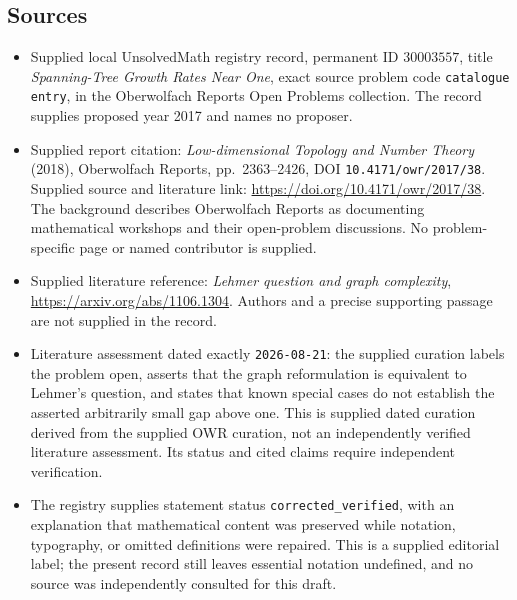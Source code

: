\documentclass[11pt]{article}
\begin{document}
\subsection{Sources}
\begin{itemize}
\item Supplied local UnsolvedMath registry record, permanent ID \(30003557\), title \emph{Spanning-Tree Growth Rates Near One}, exact source problem code \texttt{catalogue entry}, in the Oberwolfach Reports Open Problems collection. The record supplies proposed year 2017 and names no proposer.
\item Supplied report citation: \emph{Low-dimensional Topology and Number Theory} (2018), Oberwolfach Reports, pp.~2363--2426, DOI \texttt{10.4171/owr/2017/38}. Supplied source and literature link: \url{https://doi.org/10.4171/owr/2017/38}. The background describes Oberwolfach Reports as documenting mathematical workshops and their open-problem discussions. No problem-specific page or named contributor is supplied.
\item Supplied literature reference: \emph{Lehmer question and graph complexity}, \url{https://arxiv.org/abs/1106.1304}. Authors and a precise supporting passage are not supplied in the record.
\item Literature assessment dated exactly \texttt{2026-08-21}: the supplied curation labels the problem open, asserts that the graph reformulation is equivalent to Lehmer's question, and states that known special cases do not establish the asserted arbitrarily small gap above one. This is supplied dated curation derived from the supplied OWR curation, not an independently verified literature assessment. Its status and cited claims require independent verification.
\item The registry supplies statement status \texttt{corrected\_verified}, with an explanation that mathematical content was preserved while notation, typography, or omitted definitions were repaired. This is a supplied editorial label; the present record still leaves essential notation undefined, and no source was independently consulted for this draft.
\end{itemize}
\end{document}
